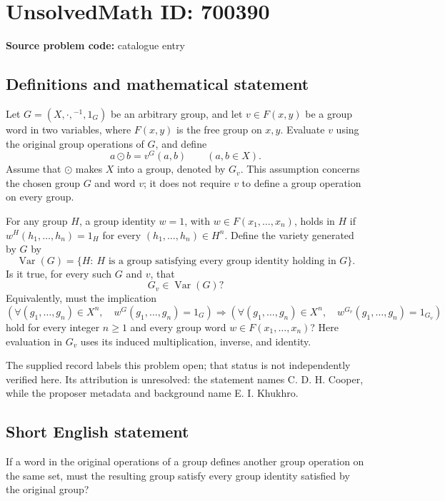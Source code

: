 \documentclass[11pt]{article}
\begin{document}
\section*{UnsolvedMath ID: 700390}
\textbf{Source problem code:} catalogue entry
\subsection{Definitions and mathematical statement}
Let \(G=(X,\cdot,{}^{-1},1_G)\) be an arbitrary group, and let \(v\in F(x,y)\) be a group word in two variables, where \(F(x,y)\) is the free group on \(x,y\). Evaluate \(v\) using the original group operations of \(G\), and define
\[
a\odot b=v^G(a,b)\qquad(a,b\in X).
\]
Assume that \(\odot\) makes \(X\) into a group, denoted by \(G_v\). This assumption concerns the chosen group \(G\) and word \(v\); it does not require \(v\) to define a group operation on every group.

For any group \(H\), a group identity \(w=1\), with \(w\in F(x_1,\ldots,x_n)\), holds in \(H\) if \(w^H(h_1,\ldots,h_n)=1_H\) for every \((h_1,\ldots,h_n)\in H^n\). Define the variety generated by \(G\) by
\[
\operatorname{Var}(G)=\{H:\ H\text{ is a group satisfying every group identity holding in }G\}.
\]
Is it true, for every such \(G\) and \(v\), that
\[
G_v\in\operatorname{Var}(G)?
\]
Equivalently, must the implication
\[
\left(\forall (g_1,\ldots,g_n)\in X^n,\quad w^G(g_1,\ldots,g_n)=1_G\right)
\Longrightarrow
\left(\forall (g_1,\ldots,g_n)\in X^n,\quad w^{G_v}(g_1,\ldots,g_n)=1_{G_v}\right)
\]
hold for every integer \(n\geq 1\) and every group word \(w\in F(x_1,\ldots,x_n)\)? Here evaluation in \(G_v\) uses its induced multiplication, inverse, and identity.

The supplied record labels this problem open; that status is not independently verified here. Its attribution is unresolved: the statement names C. D. H. Cooper, while the proposer metadata and background name E. I. Khukhro.
\subsection{Short English statement}
If a word in the original operations of a group defines another group operation on the same set, must the resulting group satisfy every group identity satisfied by the original group?
\end{document}
